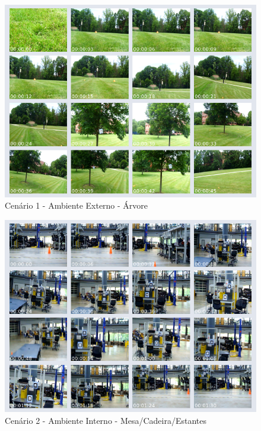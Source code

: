 \begin{figure}[H]
	\centering
	\includegraphics[scale=0.55]{./Resources/thumbs/thumb_video10_l.png}
	\caption{Cenário 1 - Ambiente Externo - Árvore}
	\label{thumb_video10_l}
\end{figure}

\begin{figure}[H]
	\centering
	\includegraphics[scale=0.55]{./Resources/thumbs/thumb_video12_l.png}
	\caption{Cenário 2 - Ambiente Interno - Mesa/Cadeira/Estantes}
	\label{thumb_video12_l}
\end{figure}

